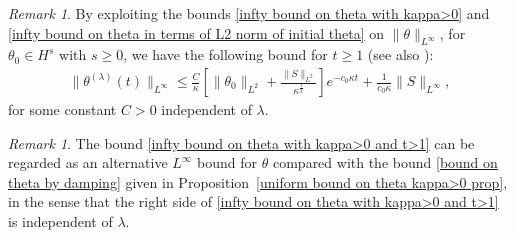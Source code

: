\documentclass[reqno]{amsart}%
\theoremstyle{definition}
\theoremstyle{remark}
\numberwithin{equation}{section}
\newtheorem{remark}[theorem]{Remark}
\newcommand{\thetalambda}{\theta^{(\lambda)}}
\newcommand{\1}{\mathbf{1}}
\numberwithin{equation}{section}
\numberwithin{theorem}{section}
\numberwithin{figure}{section}
\begin{document}
\begin{remark}
By exploiting the bounds \eqref{infty bound on theta with kappa>0} and \eqref{infty bound on theta in terms of L2 norm of initial theta} on $\|\theta\|_{L^\infty}$, for $\theta_0\in H^s$ with $s\ge0$, we have the following bound for $t\ge1$ (see also \cite[Theorem~3.2]{CZV16}):
\begin{align}\label{infty bound on theta with kappa>0 and t>1}
\|\thetalambda(t)\|_{L^\infty}\le\frac{C}{\kappa}\left[\|\theta_0\|_{L^2}+\frac{\|S\|_{L^2}}{\kappa^\frac{1}{2}}\right]e^{-c_0\kappa t}+\frac{1}{c_0\kappa}\|S\|_{L^\infty},
\end{align}
for some constant $C>0$ independent of $\lambda$. 
\end{remark}
\begin{remark}
The bound \eqref{infty bound on theta with kappa>0 and t>1} can be regarded as an alternative $L^\infty$ bound for $\theta$ compared with the bound \eqref{bound on theta by damping} given in Proposition~\ref{uniform bound on theta kappa>0 prop}, in the sense that the right side of \eqref{infty bound on theta with kappa>0 and t>1} is independent of $\lambda$.
\end{remark}
\end{document}
